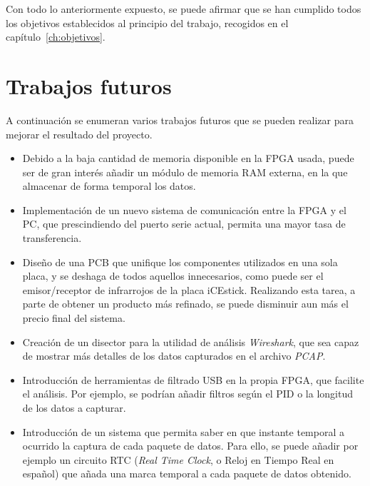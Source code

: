 Con todo lo anteriormente expuesto, se puede afirmar que se han cumplido todos los objetivos establecidos al principio del trabajo, recogidos en el capítulo~\ref{ch:objetivos}.



\section{Trabajos futuros}
A continuación se enumeran varios trabajos futuros que se pueden realizar para mejorar el resultado del proyecto.

\begin{itemize}
    \item Debido a la baja cantidad de memoria disponible en la FPGA usada, puede ser de gran interés añadir un módulo de memoria RAM externa, en la que almacenar de forma temporal los datos.
    
    \item Implementación de un nuevo sistema de comunicación entre la FPGA y el PC, que prescindiendo del puerto serie actual, permita una mayor tasa de transferencia.
    
    \item Diseño de una PCB que unifique los componentes utilizados en una sola placa, y se deshaga de todos aquellos innecesarios, como puede ser el emisor/receptor de infrarrojos de la placa iCEstick. Realizando esta tarea, a parte de obtener un producto más refinado, se puede disminuir aun más el precio final del sistema.
    
    \item Creación de un disector para la utilidad de análisis \emph{Wireshark}, que sea capaz de mostrar más detalles de los datos capturados en el archivo \emph{PCAP}.
    
    \item Introducción de herramientas de filtrado USB en la propia FPGA, que facilite el análisis. Por ejemplo, se podrían añadir filtros según el PID o la longitud de los datos a capturar.

    \item Introducción de un sistema que permita saber en que instante temporal a ocurrido la captura de cada paquete de datos. Para ello, se puede añadir por ejemplo un circuito RTC (\emph{Real Time Clock}, o Reloj en Tiempo Real en español) que añada una marca temporal a cada paquete de datos obtenido.
\end{itemize}


